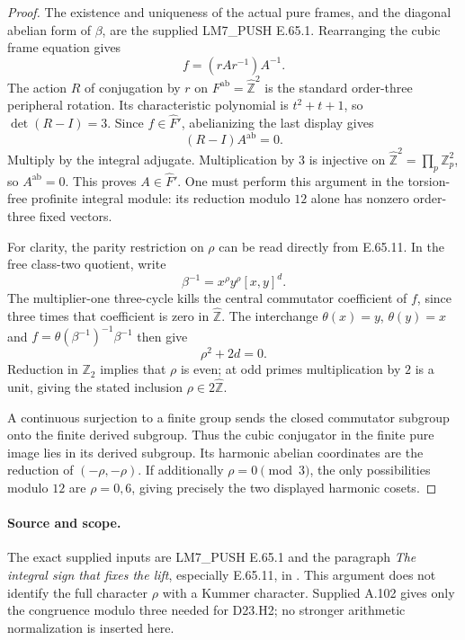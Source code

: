 \begin{proof}
The existence and uniqueness of the actual pure frames,
and the diagonal abelian form of $\beta$, are the supplied
LM7\_PUSH E.65.1. Rearranging the cubic frame equation gives
\[
                    f=(rAr^{-1})A^{-1}.
\]
The action $R$ of conjugation by $r$ on
$F^{\mathrm{ab}}=\widehat{\mathbb Z}^2$ is the standard
order-three peripheral rotation. Its characteristic
polynomial is $t^2+t+1$, so $\det(R-I)=3$.
Since $f\in\widehat F'$, abelianizing the last display gives
\[
                       (R-I)A^{\mathrm{ab}}=0.
\]
Multiply by the integral adjugate. Multiplication by $3$
is injective on $\widehat{\mathbb Z}^2=\prod_p\mathbb Z_p^2$,
so $A^{\mathrm{ab}}=0$. This proves $A\in\widehat F'$.
One must perform this argument in the torsion-free
profinite integral module: its reduction modulo $12$ alone
has nonzero order-three fixed vectors.

For clarity, the parity restriction on $\rho$ can be read
directly from E.65.11. In the free class-two quotient,
write
\[
          \beta^{-1}=x^\rho y^\rho[x,y]^d.
\]
The multiplier-one three-cycle kills the central
commutator coefficient of $f$, since three times that
coefficient is zero in $\widehat{\mathbb Z}$. The
interchange $\theta(x)=y$, $\theta(y)=x$ and
$f=\theta(\beta^{-1})^{-1}\beta^{-1}$ then give
\[
                            \rho^2+2d=0.
\]
Reduction in $\mathbb Z_2$ implies that $\rho$ is even;
at odd primes multiplication by $2$ is a unit, giving the
stated inclusion $\rho\in2\widehat{\mathbb Z}$.

A continuous surjection to a finite group sends the
closed commutator subgroup onto the finite derived
subgroup. Thus the cubic conjugator in the finite pure
image lies in its derived subgroup. Its harmonic
abelian coordinates are the reduction of
$(-\rho,-\rho)$. If additionally $\rho=0\pmod3$,
the only possibilities modulo $12$ are $\rho=0,6$,
giving precisely the two displayed harmonic cosets.
\end{proof}

\paragraph{Source and scope.}
The exact supplied inputs are LM7\_PUSH E.65.1 and the
paragraph \emph{The integral sign that fixes the lift},
especially E.65.11, in
.
This argument does not identify the full character
$\rho$ with a Kummer character. Supplied A.102 gives only
the congruence modulo three needed for D23.H2; no stronger
arithmetic normalization is inserted here.
